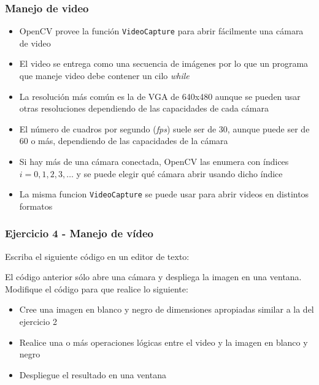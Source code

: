 \begin{frame}\frametitle{Manejo de video}
  \begin{itemize}
  \item OpenCV provee la función \texttt{VideoCapture} para abrir fácilmente una cámara de video
  \item El video se entrega como una secuencia de imágenes por lo que un programa que maneje video debe contener un cilo \textit{while}
  \item La resolución más común es la de VGA de 640x480 aunque se pueden usar otras resoluciones dependiendo de las capacidades de cada cámara
  \item El número de cuadros por segundo (\textit{fps}) suele ser de 30, aunque puede ser de 60 o más, dependiendo de las capacidades de la cámara
  \item Si hay más de una cámara conectada, OpenCV las enumera con índices $i=0,1,2,3,\dots$ y se puede elegir qué cámara abrir usando dicho índice
  \item La misma funcion \texttt{VideoCapture} se puede usar para abrir videos en distintos formatos
  \end{itemize}
\end{frame}

\begin{frame}[containsverbatim]\frametitle{Ejercicio 4 - Manejo de vídeo}
  Escriba el siguiente código en un editor de texto:
  
  El código anterior sólo abre una cámara y despliega la imagen en una ventana. Modifique el código para que realice lo siguiente:
  \begin{itemize}
  \item Cree una imagen en blanco y negro de dimensiones apropiadas similar a la del ejercicio 2
  \item Realice una o más operaciones lógicas entre el video y la imagen en blanco y negro
  \item Despliegue el resultado en una ventana
  \end{itemize}
\end{frame}
